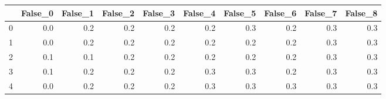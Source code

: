 \begin{tabular}{lrrrrrrrrr}
\toprule
{} &  False\_0 &  False\_1 &  False\_2 &  False\_3 &  False\_4 &  False\_5 &  False\_6 &  False\_7 &  False\_8 \\ \hline
\midrule
0 &      0.0 &      0.2 &      0.2 &      0.2 &      0.2 &      0.3 &      0.2 &      0.3 &      0.3 \\ \hline
1 &      0.0 &      0.2 &      0.2 &      0.2 &      0.2 &      0.2 &      0.2 &      0.3 &      0.3 \\ \hline
2 &      0.1 &      0.1 &      0.2 &      0.2 &      0.2 &      0.2 &      0.2 &      0.3 &      0.3 \\ \hline
3 &      0.1 &      0.2 &      0.2 &      0.2 &      0.3 &      0.3 &      0.2 &      0.3 &      0.3 \\ \hline
4 &      0.0 &      0.2 &      0.2 &      0.2 &      0.3 &      0.3 &      0.3 &      0.3 &      0.3 \\ \hline
\bottomrule
\end{tabular}
